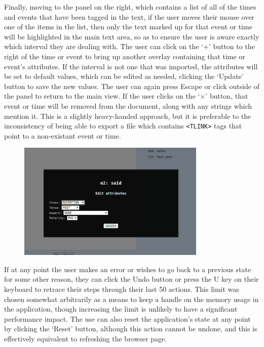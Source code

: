\documentclass[a4paper,12pt,leqno,twoside]{article}
\begin{document}
Finally, moving to the panel on the right, which contains a list of all of the times and events that have been tagged in the text, if the user moves their mouse over one of the items in the list, then only the text marked up for that event or time will be highlighted in the main text area, so as to ensure the user is aware exactly which interval they are dealing with. The user can click on the `+' button to the right of the time or event to bring up another overlay containing that time or event's attributes. If the interval is not one that was imported, the attributes will be set to default values, which can be edited as needed, clicking the `Update' button to save the new values. The user can again press Escape or click outside of the panel to return to the main view. If the user clicks on the `$\times$' button, that event or time will be removed from the document, along with any strings which mention it. This is a slightly heavy-handed approach, but it is preferable to the inconsistency of being able to export a file which contains \verb|<TLINK>| tags that point to a non-existant event or time.
\begin{center}
	\begin{figure}[h!]
		\centering
		\includegraphics[width=0.8\textwidth]{images/START-event-attrs.png}
	\end{figure}
\end{center}
If at any point the user makes an error or wishes to go back to a previous state for some other reason, they can click the Undo button or press the U key on their keyboard to retrace their steps through their last 50 actions. This limit was chosen somewhat arbitrarily as a means to keep a handle on the memory usage in the application, though increasing the limit is unlikely to have a significant performance impact. The use can also reset the application's state at any point by clicking the `Reset' button, although this action cannot be undone, and this is effectively equivalent to refreshing the browser page.
\end{document}
